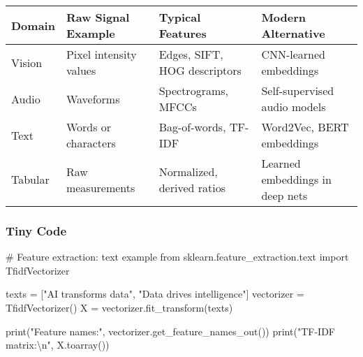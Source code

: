 \documentclass[
  letterpaper,
  DIV=11,
  numbers=noendperiod]{scrreprt}
\newenvironment{Shaded}{\begin{snugshade}}{\end{snugshade}}
\newcommand{\BuiltInTok}[1]{\textcolor[rgb]{0.00,0.23,0.31}{#1}}
\newcommand{\CharTok}[1]{\textcolor[rgb]{0.13,0.47,0.30}{#1}}
\newcommand{\CommentTok}[1]{\textcolor[rgb]{0.37,0.37,0.37}{#1}}
\newcommand{\ImportTok}[1]{\textcolor[rgb]{0.00,0.46,0.62}{#1}}
\newcommand{\NormalTok}[1]{\textcolor[rgb]{0.00,0.23,0.31}{#1}}
\newcommand{\OperatorTok}[1]{\textcolor[rgb]{0.37,0.37,0.37}{#1}}
\newcommand{\StringTok}[1]{\textcolor[rgb]{0.13,0.47,0.30}{#1}}
\begin{document}
\begin{longtable}[]{@{}
  >{\raggedright\arraybackslash}p{}
  >{\raggedright\arraybackslash}p{}
  >{\raggedright\arraybackslash}p{}
  >{\raggedright\arraybackslash}p{}@{}}
\toprule\noalign{}
\begin{minipage}[b]{\linewidth}\raggedright
Domain
\end{minipage} & \begin{minipage}[b]{\linewidth}\raggedright
Raw Signal Example
\end{minipage} & \begin{minipage}[b]{\linewidth}\raggedright
Typical Features
\end{minipage} & \begin{minipage}[b]{\linewidth}\raggedright
Modern Alternative
\end{minipage} \\
\midrule\noalign{}
\endhead
\bottomrule\noalign{}
\endlastfoot
Vision & Pixel intensity values & Edges, SIFT, HOG descriptors &
CNN-learned embeddings \\
Audio & Waveforms & Spectrograms, MFCCs & Self-supervised audio
models \\
Text & Words or characters & Bag-of-words, TF-IDF & Word2Vec, BERT
embeddings \\
Tabular & Raw measurements & Normalized, derived ratios & Learned
embeddings in deep nets \\
\end{longtable}

\subsubsection{Tiny Code}\label{tiny-code-76}

\begin{Shaded}
\begin{Highlighting}[]
\CommentTok{\# Feature extraction: text example}
\ImportTok{from}\NormalTok{ sklearn.feature\_extraction.text }\ImportTok{import}\NormalTok{ TfidfVectorizer}

\NormalTok{texts }\OperatorTok{=}\NormalTok{ [}\StringTok{"AI transforms data"}\NormalTok{, }\StringTok{"Data drives intelligence"}\NormalTok{]}
\NormalTok{vectorizer }\OperatorTok{=}\NormalTok{ TfidfVectorizer()}
\NormalTok{X }\OperatorTok{=}\NormalTok{ vectorizer.fit\_transform(texts)}

\BuiltInTok{print}\NormalTok{(}\StringTok{"Feature names:"}\NormalTok{, vectorizer.get\_feature\_names\_out())}
\BuiltInTok{print}\NormalTok{(}\StringTok{"TF{-}IDF matrix:}\CharTok{\textbackslash{}n}\StringTok{"}\NormalTok{, X.toarray())}
\end{Highlighting}
\end{Shaded}
\end{document}
